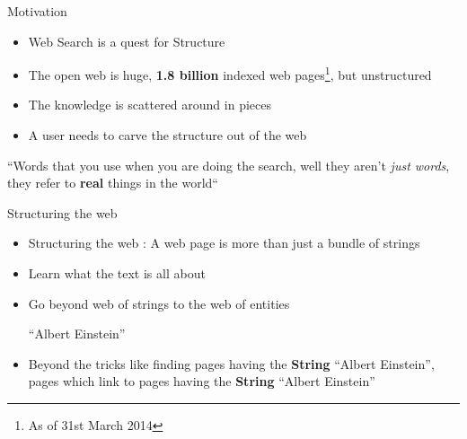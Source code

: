 \begin{frame}{Motivation}


 \begin{itemize}
  \item Web Search is a quest for Structure \medskip
  \item The open web is huge, \textbf{1.8 billion} indexed web pages\footnote{As of 31st March 2014}, but unstructured  \medskip
  \item The knowledge is scattered around in pieces \medskip
  \item A user needs to carve the structure out of the web  \medskip

 
 \end{itemize}

\end{frame}

\begin{frame}
\begin{exampleblock}{}
  {\large ``Words that you use when you are doing the search, well they aren't \emph{just words}, they refer to \textbf{real} things
in the world``}
  \vskip5mm
  \hspace*{}
\end{exampleblock}
\end{frame}

\begin{frame}{Structuring the web}
 \begin{itemize}
   \item Structuring the web : A web page is more than just a bundle of strings \medskip
  \item Learn what the text is all about \medskip
  \item Go beyond web of strings to the web of entities \medskip
   \begin{center}``Albert Einstein'' \end{center}\medskip
  \item Beyond the tricks like finding pages having the \textbf{String} ``Albert Einstein'', \medskip
  pages which link to pages having the \textbf{String} ``Albert Einstein''
  
 \end{itemize}

\end{frame}


